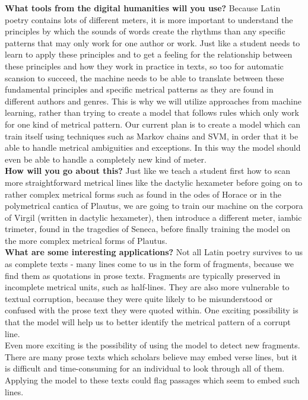 \textbf{What tools from the digital humanities will you use?}
Because Latin poetry contains lots of different meters, it is more important to understand the principles by which the sounds of words create the rhythms than any specific patterns that may only work for one author or work. Just like a student needs to learn to apply these principles and to get a feeling for the relationship between these principles and how they work in practice in texts, so too for automatic scansion to succeed, the machine needs to be able to translate between these fundamental principles and specific metrical patterns as they are found in different authors and genres. This is why we will utilize approaches from machine learning, rather than trying to create a model that follows rules which only work for one kind of metrical pattern. Our current plan is to create a model which can train itself using techniques such as Markov chains and SVM, in order that it be able to handle metrical ambiguities and exceptions. In this way the model should even be able to handle a completely new kind of meter.\\

\textbf{How will you go about this?}
Just like we teach a student first how to scan more straightforward metrical lines like the dactylic hexameter before going on to rather complex metrical forms such as found in the odes of Horace or in the polymetrical cantica of Plautus, we are going to train our machine on the corpora of Virgil (written in dactylic hexameter), then introduce a different meter, iambic trimeter, found in the tragedies of Seneca, before finally training the model on the more complex metrical forms of Plautus.\\

\textbf{What are some interesting applications?}
Not all Latin poetry survives to us as complete texts - many lines come to us in the form of fragments, because we find them as quotations in prose texts. Fragments are typically preserved in incomplete metrical units, such as half-lines. They are also more vulnerable to textual corruption, because they were quite likely to be misunderstood or confused with the prose text they were quoted within. One exciting possibility is that the model will help us to better identify the metrical pattern of a corrupt line.\\

Even more exciting is the possibility of using the model to detect new fragments. There are many prose texts which scholars believe may embed verse lines, but it is difficult and time-consuming for an individual to look through all of them. Applying the model to these texts could flag passages which seem to embed such lines.\\

